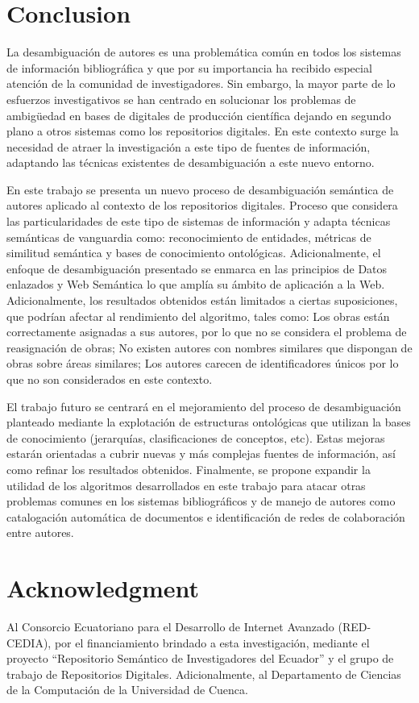 \documentclass[conference]{IEEEtran}
\begin{document}
\section{Conclusion}
La desambiguación de autores es una problemática común en todos los sistemas de información bibliográfica y que por su importancia ha recibido especial atención de la comunidad de investigadores. Sin embargo, la mayor parte de lo esfuerzos investigativos se han centrado en solucionar los problemas de ambigüedad en bases de digitales de producción científica dejando   en segundo plano a otros sistemas como los repositorios digitales. En este contexto surge la necesidad de atraer la investigación a este tipo de fuentes de información, adaptando las técnicas existentes de desambiguación a este nuevo entorno.

En este trabajo se presenta un nuevo proceso de desambiguación semántica de autores aplicado al contexto de los repositorios digitales. Proceso que considera las particularidades de este tipo de sistemas de información y adapta técnicas semánticas de vanguardia como: reconocimiento de entidades, métricas de similitud semántica y bases de conocimiento ontológicas. Adicionalmente, el enfoque de desambiguación presentado se enmarca en las principios de Datos enlazados y Web Semántica lo que amplía su ámbito de aplicación a la Web. 
Adicionalmente, los resultados obtenidos están limitados a ciertas suposiciones, que podrían afectar al rendimiento del algoritmo, tales como:  Los obras están correctamente asignadas a sus autores, por lo que no se considera el problema de reasignación de obras; No existen autores con nombres similares que  dispongan de obras sobre  áreas similares;  Los autores carecen de identificadores únicos por lo que no son considerados en este contexto.

El trabajo futuro se centrará en el mejoramiento del proceso de desambiguación planteado mediante la explotación de estructuras ontológicas que utilizan la bases de conocimiento (jerarquías, clasificaciones de conceptos, etc). Estas mejoras estarán orientadas a cubrir nuevas y más complejas fuentes de información, así como refinar los resultados obtenidos. Finalmente, se propone expandir la utilidad de los algoritmos desarrollados en este trabajo para atacar otras problemas comunes en los sistemas bibliográficos y de manejo de autores como  catalogación automática de documentos e identificación de redes de colaboración entre autores.

\section*{Acknowledgment}
Al Consorcio Ecuatoriano para el Desarrollo de Internet Avanzado (RED-CEDIA), por el financiamiento brindado a esta investigación, mediante el proyecto “Repositorio Semántico de Investigadores del Ecuador” y el grupo de trabajo de Repositorios Digitales. Adicionalmente, al Departamento de Ciencias de la Computación de la Universidad de Cuenca.
\end{document}
